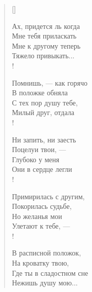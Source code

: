 \newpage
\vspace*{0cm}

\settowidth{\versewidth}{\vinМне тебя приласкать\ldotsq}
\begin{verse}[\versewidth]
\begin{altverse}
Ах, придется ль когда\\
   Мне тебя приласкать\ldotsq\\
Мне к другому теперь\\
   Тяжело привыкать...\\!

Помнишь, --- как горячо\\
    В положке обняла\ldotsq\\
С тех пор душу тебе,\\
    Милый друг, отдала\ldotst\\!

Ни запить, ни заесть\\
    Поцелуи твои, ---\\
Глубоко у меня\\
    Они в сердце легли\ldotst\\!

Примирилась с другим,\\
    Покорилась судьбе,\\
Но желанья мои\\
    Улетают к тебе, ---\\!

В расписной положок,\\
    На кроватку твою,\\
Где ты в сладостном сне\\
    Нежишь душу мою...
\end{altverse}
\end{verse}

\newpage
\vspace*{0cm}

